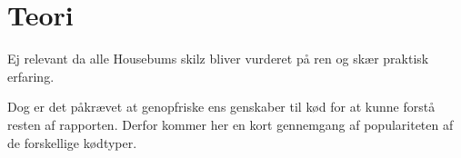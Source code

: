 \section{Teori}
Ej relevant da alle Housebums skilz bliver vurderet på ren og skær praktisk erfaring.

Dog er det påkrævet at genopfriske ens genskaber til kød for at kunne forstå resten af rapporten. Derfor kommer her en kort gennemgang af populariteten af de forskellige kødtyper.